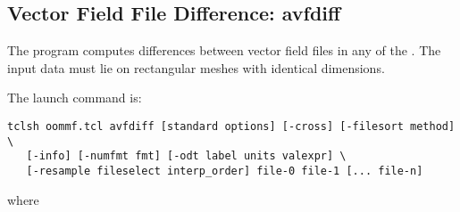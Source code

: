 
\subsection{Vector Field File Difference:
          avfdiff}\label{sec:avfdiff}%
%
The  program computes differences between vector field files
in any of the .  The input data must lie on rectangular meshes with
identical dimensions.

The  launch command is:
\begin{verbatim}
tclsh oommf.tcl avfdiff [standard options] [-cross] [-filesort method] \
   [-info] [-numfmt fmt] [-odt label units valexpr] \
   [-resample fileselect interp_order] file-0 file-1 [... file-n]
\end{verbatim}
where

